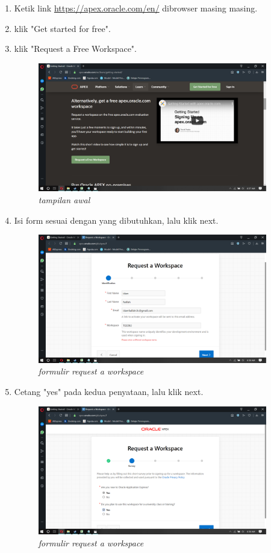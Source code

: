 \documentclass[12pt]{ociamthesis}  %
\begin{document}
\begin{enumerate}
	\item Ketik link \url{https://apex.oracle.com/en/} dibrowser masing masing.	
	\item klik "Get started for free".
	\item klik "Request a Free Workspace".
	
	\begin{figure}[H]
    \centering
    \includegraphics[width=10cm]{figures/gambar/Screenshot (106).png} 
    \caption{\textit{tampilan awal}}
    \label{foto1}
 	\end{figure}
	
	\item Isi form sesuai dengan yang dibutuhkan, lalu klik next.	
	
	\begin{figure}[H]
    \centering
    \includegraphics[width=10cm]{figures/gambar/Screenshot (108).png} 
    \caption{\textit{formulir request a workspace}}
    \label{foto2}
 	\end{figure}
	
	\item Cetang "yes" pada kedua penyataan, lalu klik next.
	
	\begin{figure}[H]
    \centering
    \includegraphics[width=10cm]{figures/gambar/Screenshot (109).png}  
    \caption{\textit{formulir request a workspace}}
    \label{foto3}
 	\end{figure}
		

\end{enumerate}
\end{document}
